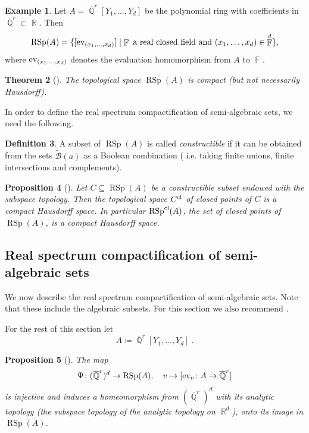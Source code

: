 \documentclass{amsart}
\theoremstyle{plain}
\newtheorem{proposition}{Proposition}[section]
\newtheorem{theorem}[proposition]{Theorem}
\theoremstyle{definition}
\newtheorem{example}[proposition]{Example}
\newtheorem{definition}[proposition]{Definition}
\DeclareMathOperator{\rsp}{RSp}
\DeclareMathOperator{\Fb}{{\mathbb{F}}}
\DeclareMathOperator{\Rb}{{\mathbb{R}}}
\DeclareMathOperator{\Qb}{\mathbb{Q}}
\newcommand*\from{\colon}
\newcommand{\cl}{\textnormal{cl}}
\newcommand{\1}{\mathbf{1}}
\begin{document}
\begin{example}
    Let $A = \overline{\Qb}^r[Y_1,\ldots,Y_d]$ be the polynomial ring with coefficients in $\overline{\Qb}^r \subset \Rb$.
    Then 
    \[\rsp(A) = \{ [\textnormal{ev}_{(x_1,\ldots,x_d)}] \mid \Fb \textrm{ a real closed field and }(x_1,\ldots,x_d) \in \Fb^d\},\]
    where $\textnormal{ev}_{(x_1,\ldots,x_d)}$ denotes the evaluation homomorphism from $A$ to $\Fb$.
\end{example}

\begin{theorem}[{\cite[Proposition 7.1.12]{BochnakCosteRoy_RealAlgebraicGeometry}}]
\label{thm_RSCTopolProp}
The topological space $\rsp(A)$ is compact (but not necessarily Hausdorff).
\end{theorem}

In order to define the real spectrum compactification of semi-algebraic sets, we need the following.
\begin{definition}
A subset of $\rsp(A)$ is called \emph{constructible} if it can be obtained from the sets $\widetilde{\mathcal{B}}(a)$ as a Boolean combination ( i.e. taking finite unions, finite intersections and complements). 
\end{definition}

\begin{proposition}[{\cite[Proposition 7.1.25 (ii)]{BochnakCosteRoy_RealAlgebraicGeometry}}]
\label{propo_RSpClHausdorff}
Let $C \subseteq \rsp(A)$ be a constructible subset endowed with the subspace topology.
Then the topological space $C^\cl$ of closed points of $C$ is a compact Hausdorff space.
In particular $\rsp^\cl(A)$, the set of closed points of $\rsp(A)$, is a compact Hausdorff space.
\end{proposition}


\subsection{Real spectrum compactification of semi-algebraic sets}
\label{subs_RSCsemi-algebraicSets}

We now describe the real spectrum compactification of semi-algebraic sets.
Note that these include the algebraic subsets.
For this section we also recommend \cite[Chapter~4]{Scheiderer_RAG}.

For the rest of this section let 
\[A \coloneqq \overline{\Qb}^r[Y_1,\ldots,Y_d]~.\]
\begin{proposition}[{\cite[Proposition 7.1.5]{BochnakCosteRoy_RealAlgebraicGeometry}}]
\label{propo_ImageVInRealSpec}
    The map 
    \[\Psi \from (\overline{\Qb}^r)^d \to \rsp(A), \quad v \mapsto [\textnormal{ev}_v \from A \to \overline{\Qb}^r]\]
    is injective and induces a homeomorphism from $(\overline{\Qb}^r)^d$ with its analytic topology (the subspace topology of the analytic topology on $\Rb^d$), onto its image in $\rsp(A)$.
\end{proposition}
\end{document}
